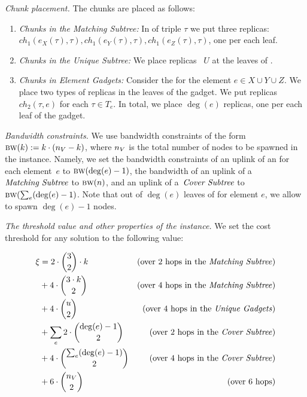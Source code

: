 \emph{Chunk placement.}
The chunks are placed as follows:
\begin{enumerate}
  \item \emph{Chunks in the Matching Subtree:} In {\TripleGadget} of triple $\tau$ we put
  three replicas:
 ~$ch_1(e_X(\tau), \tau), ch_1(e_Y(\tau), \tau), ch_1(e_Z(\tau), \tau)$, one per each leaf.
  \item \emph{Chunks in the Unique Subtree:} We place replicas
 ~$U$ at the leaves of \UnqGadgets.
 \item \emph{Chunks in Element Gadgets:} Consider the \ElGadget{} for the element $e \in X\cup Y\cup Z$.
 We place two types of replicas in the leaves of the gadget.
 We put replicas $ch_2(\tau, e)$ for each $\tau \in T_e$.
 In total, we place $\deg(e)$ replicas, one per each leaf of the gadget.
\end{enumerate}

\emph{Bandwidth constraints.} We use bandwidth constraints of the form
$\textsc{bw}(k) := k\cdot(n_V - k)$, where $n_V$ is the total number of nodes to be spawned in the instance. Namely, we set the bandwidth
constraints of an uplink of an {\ElGadget} for each element~$e$ to 
$\textsc{bw}(\deg(e)-1)$, the bandwidth of an uplink of a~${\emph{Matching Subtree}}$ to 
$\textsc{bw}(n)$, and an uplink of a~${\emph{Cover Subtree}}$ to 
$\textsc{bw}(\sum_e (\deg(e)-1)$.
Note that out of $\deg(e)$ leaves of \ElGadget{} for element $e$, we allow to spawn $\deg(e)-1$ nodes.

\emph{The threshold value and other properties of the instance.} We set the
cost threshold for any solution to the following value:

\begin{footnotesize}
\begin{align*}
  \xi  & = 2\cdot \binom{3}{2}\cdot k & \mbox{(over 2 hops in the {\emph{Matching Subtree}}{})}\\
        & + 4 \cdot \binom{3\cdot k}{2} & \mbox{(over 4 hops in the {\emph{Matching Subtree}}{})}\\
        & + 4 \cdot \binom{u}{2} & \mbox{(over 4 hops in the {\emph{Unique Gadgets}}{})}\\
        & + \sum_e 2\cdot\binom{\deg(e)-1}{2} & \mbox{(over 2 hops in the {\emph{Cover Subtree}}{})}\\
        & + 4\cdot \binom{\sum_e(\deg(e)-1)}{2} & \mbox{(over 4 hops in the {\emph{Cover Subtree}}{})}\\
        & + 6\cdot\binom{n_V}{2} & \mbox{(over 6 hops)}
\end{align*}
\end{footnotesize}

